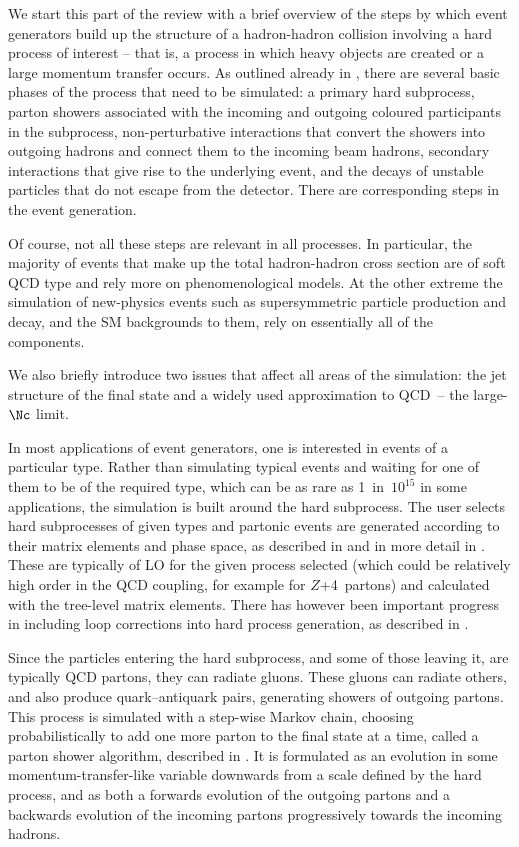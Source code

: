 We start this part of the review with a brief overview of the steps by
which event generators build up the structure of a hadron-hadron
collision involving a hard process of interest -- that is, a process
in which heavy objects are created or a large momentum transfer
occurs. As outlined already in ,
there are several
basic phases of the process that need to be simulated: a primary hard
subprocess, parton showers associated with the incoming and outgoing
coloured participants in the subprocess, non-perturbative interactions
that convert the showers into outgoing hadrons and connect them to the
incoming beam hadrons, secondary interactions that give rise to the
underlying event, and the decays of unstable particles that do not
escape from the detector. There are corresponding steps in the event generation.

Of course, not all these
steps are relevant in all processes.  In particular, the majority of
events that make up the total hadron-hadron cross section are of
soft QCD type and rely more on phenomenological models.  At the
other extreme the simulation of new-physics events such as
supersymmetric particle production and decay, and the SM backgrounds to
them, rely on essentially all of the components.

We also briefly introduce two issues that affect all areas of the
simulation: the jet structure of the final state and a widely used
approximation to QCD~-- the large-$\Nc$ limit.

In most applications of event generators, one is interested in events of
a particular type.  Rather than simulating typical events and waiting
for one of them to be of the required type, which can be as rare as
1~in~$10^{15}$ in some applications, the simulation is built around the
hard subprocess.  The user selects hard subprocesses of given types and
partonic events are generated according to their matrix elements
and phase space, as described in  and in more
detail in .  These are typically of LO for the given
process selected (which could be relatively high order in the QCD
coupling, for example for $Z$+4~partons) and calculated with the
tree-level matrix elements.  There has however been important progress
in including loop corrections into hard process generation, as described
in .

Since the particles entering the hard subprocess, and some of those
leaving it, are typically
QCD partons, they can radiate gluons.  These gluons can radiate
others, and also produce
quark--antiquark pairs, generating showers of outgoing partons.
This process is simulated with a step-wise Markov
chain, choosing probabilistically to add one more parton to the final
state at a time, called a parton shower algorithm, described in
.  It is formulated as an evolution in some
momentum-transfer-like variable downwards from a scale defined by the
hard process, and as both a forwards evolution of the outgoing partons
and a backwards evolution of the incoming partons progressively towards
the incoming hadrons.

